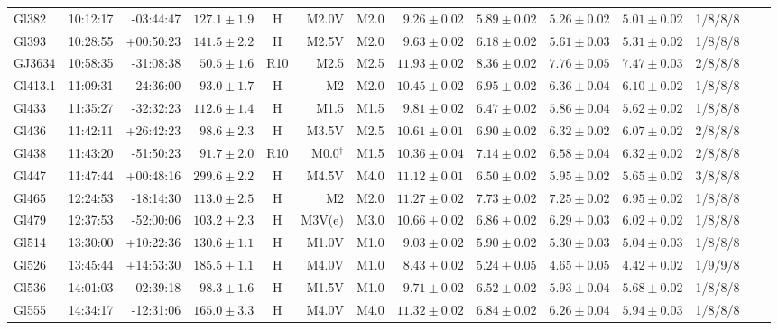 \documentclass{aa}
\begin{document}
\begin{table}[h!]
{\begin{tabular}{ l r r r c r r r r r r r r r}
Gl382 & 10:12:17 & -03:44:47 & $127.1 \pm  1.9$ & H & M2.0V & M2.0 &  $9.26 \pm 0.02$ & $5.89 \pm 0.02$ & $5.26 \pm 0.02$ & $5.01 \pm 0.02$ & 1/8/8/8 \\
Gl393 & 10:28:55 & +00:50:23 & $141.5 \pm  2.2$ & H & M2.5V & M2.0 &  $9.63 \pm 0.02$ & $6.18 \pm 0.02$ & $5.61 \pm 0.03$ & $5.31 \pm 0.02$ & 1/8/8/8 \\
GJ3634 & 10:58:35 & -31:08:38 & $50.5 \pm  1.6$ & R10 & M2.5 & M2.5 &  $11.93 \pm 0.02$ & $8.36 \pm 0.02$ & $7.76 \pm 0.05$ & $7.47 \pm 0.03$ & 2/8/8/8 \\
Gl413.1 & 11:09:31 & -24:36:00 & $93.0 \pm  1.7$ & H & M2 & M2.0 &  $10.45 \pm 0.02$ & $6.95 \pm 0.02$ & $6.36 \pm 0.04$ & $6.10 \pm 0.02$ & 1/8/8/8 \\
Gl433 & 11:35:27 & -32:32:23 & $112.6 \pm  1.4$ & H & M1.5 & M1.5 &  $9.81 \pm 0.02$ & $6.47 \pm 0.02$ & $5.86 \pm 0.04$ & $5.62 \pm 0.02$ & 1/8/8/8 \\
Gl436 & 11:42:11 & +26:42:23 & $98.6 \pm  2.3$ & H & M3.5V & M2.5 &  $10.61 \pm 0.01$ & $6.90 \pm 0.02$ & $6.32 \pm 0.02$ & $6.07 \pm 0.02$ & 2/8/8/8 \\
Gl438 & 11:43:20 & -51:50:23 & $91.7 \pm  2.0$ & R10 & M0.0$^\dagger$ & M1.5 &  $10.36 \pm 0.04$ & $7.14 \pm 0.02$ & $6.58 \pm 0.04$ & $6.32 \pm 0.02$ & 2/8/8/8 \\
Gl447 & 11:47:44 & +00:48:16 & $299.6 \pm  2.2$ & H & M4.5V & M4.0 &  $11.12 \pm 0.01$ & $6.50 \pm 0.02$ & $5.95 \pm 0.02$ & $5.65 \pm 0.02$ & 3/8/8/8 \\
Gl465 & 12:24:53 & -18:14:30 & $113.0 \pm  2.5$ & H & M2 & M2.0 &  $11.27 \pm 0.02$ & $7.73 \pm 0.02$ & $7.25 \pm 0.02$ & $6.95 \pm 0.02$ & 1/8/8/8 \\
Gl479 & 12:37:53 & -52:00:06 & $103.2 \pm  2.3$ & H & M3V(e) & M3.0 &  $10.66 \pm 0.02$ & $6.86 \pm 0.02$ & $6.29 \pm 0.03$ & $6.02 \pm 0.02$ & 1/8/8/8 \\
Gl514 & 13:30:00 & +10:22:36 & $130.6 \pm  1.1$ & H & M1.0V & M1.0 &  $9.03 \pm 0.02$ & $5.90 \pm 0.02$ & $5.30 \pm 0.03$ & $5.04 \pm 0.03$ & 1/8/8/8 \\
Gl526 & 13:45:44 & +14:53:30 & $185.5 \pm  1.1$ & H & M4.0V & M1.0 &  $8.43 \pm 0.02$ & $5.24 \pm 0.05$ & $4.65 \pm 0.05$ & $4.42 \pm 0.02$ & 1/9/9/8 \\
Gl536 & 14:01:03 & -02:39:18 & $98.3 \pm  1.6$ & H & M1.5V & M1.0 &  $9.71 \pm 0.02$ & $6.52 \pm 0.02$ & $5.93 \pm 0.04$ & $5.68 \pm 0.02$ & 1/8/8/8 \\
Gl555 & 14:34:17 & -12:31:06 & $165.0 \pm  3.3$ & H & M4.0V & M4.0 &  $11.32 \pm 0.02$ & $6.84 \pm 0.02$ & $6.26 \pm 0.04$ & $5.94 \pm 0.03$ & 1/8/8/8 \\

\end{tabular}}
\end{table}
\end{document}
